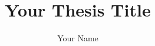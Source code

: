 \documentclass[12pt,oneside]{nusthesis}
\title{Your Thesis Title}
\author{Your Name}
\begin{document}
\begin{frontmatter}

    \maketitle


    \begin{abstract}
    
    \end{abstract}


    \begin{acknowledgments}
    
    \end{acknowledgments}

    \tableofcontents
    \listoffigures
    \listoftables
    \listofsymbolsandabbreviations
    

\end{frontmatter}







\begin{thebibliography}{99}

\end{thebibliography}

\appendix

\end{document}
